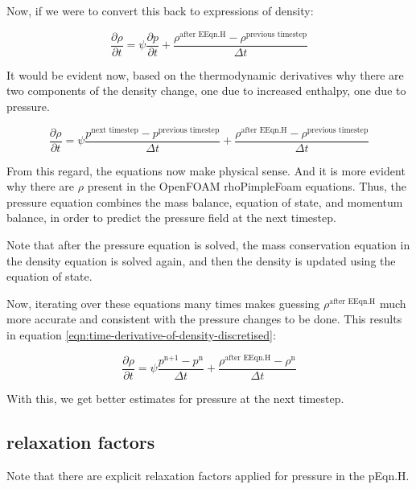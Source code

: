 \documentclass[masters]{ucbthesis}
\renewcommand{\_}{\kern-1.5pt\textunderscore\kern-1.5pt}
\begin{document}
Now, if we were to convert this back to expressions of density:

\begin{equation*}
	\frac{\partial \rho}{\partial t} = \psi \frac{\partial p}{\partial t} 
	+  \frac{\rho^{\text{after EEqn.H}} - \rho^\text{previous timestep}}{\Delta t}
\end{equation*}

It would be evident now, based on the thermodynamic derivatives why 
there are two components of the density change, one due to increased 
enthalpy, one due to pressure.


\begin{equation*}
	\frac{\partial \rho}{\partial t} = \psi 
	\frac{p^\text{next timestep} - p^\text{previous timestep}}{\Delta t} 
	+ \frac{\rho^{\text{after EEqn.H}} - \rho^\text{previous timestep}}{\Delta t}
\end{equation*}

From this regard, the equations now make physical sense. And it is more 
evident why there are $\rho$ present in the OpenFOAM rhoPimpleFoam 
equations. Thus, the pressure equation combines the mass balance,
equation of state, and momentum balance, in order to predict the pressure 
field at the next timestep.

Note that after the pressure equation is solved, 
the mass conservation equation in the density equation is solved again, 
and then the density is updated using the equation of state.

Now, iterating over these equations many times makes guessing 
$\rho^{\text{after EEqn.H}}$ much more accurate and consistent with 
the pressure changes to be done. This results in  
equation \ref{eqn:time-derivative-of-density-discretised}:

\begin{equation} \label{eqn:time-derivative-of-density-discretised}
	\frac{\partial \rho}{\partial t} = \psi 
	\frac{p^\text{n+1} - p^\text{n}}{\Delta t} 
	+ \frac{\rho^{\text{after EEqn.H}} - \rho^\text{n}}{\Delta t}
\end{equation}

With this, we get better estimates for pressure at the next timestep.

\subsection{relaxation factors}

Note that there are explicit relaxation factors applied for pressure 
in the pEqn.H.
\end{document}
